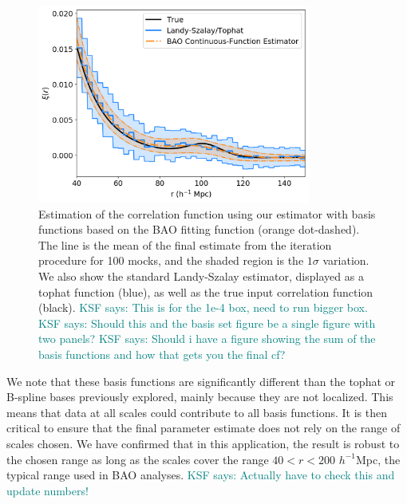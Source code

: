\documentclass[modern]{aastex62}
\newcommand{\hmpc}{$h^{-1}$Mpc}
\newcommand{\KSF}[1]{\textcolor{teal}{KSF says: #1}}
\begin{document}
\label{fig:bao}
\begin{figure}[th]
\centering
    \includegraphics[width=0.8\textwidth]{bao}
    \caption{Estimation of the correlation function using our estimator with basis functions based on the BAO fitting function (orange dot-dashed). The line is the mean of the final estimate from the iteration procedure for 100 mocks, and the shaded region is the $1\sigma$ variation. We also show the standard Landy-Szalay estimator, displayed as a tophat function (blue), as well as the true input correlation function (black). \KSF{This is for the 1e-4 box, need to run bigger box.} \KSF{Should this and the basis set figure be a single figure with two panels?} \KSF{Should i have a figure showing the sum of the basis functions and how that gets you the final cf?}}
\end{figure}

We note that these basis functions are significantly different than the tophat or B-spline bases previously explored, mainly because they are not localized.
This means that data at all scales could contribute to all basis functions.
It is then critical to ensure that the final parameter estimate does not rely on the range of scales chosen.
We have confirmed that in this application, the result is robust to the chosen range as long as the scales cover the range $40<r<200$ \hmpc, the typical range used in BAO analyses. \KSF{Actually have to check this and update numbers!}


\end{document}
